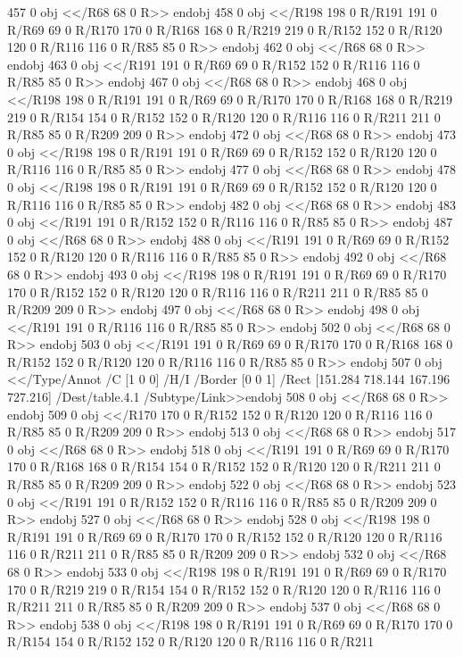 {{{{{{{{{{{{{{{{{{{{{{{{{{{{457 0 obj
<</R68
68 0 R>>
endobj
458 0 obj
<</R198
198 0 R/R191
191 0 R/R69
69 0 R/R170
170 0 R/R168
168 0 R/R219
219 0 R/R152
152 0 R/R120
120 0 R/R116
116 0 R/R85
85 0 R>>
endobj
462 0 obj
<</R68
68 0 R>>
endobj
463 0 obj
<</R191
191 0 R/R69
69 0 R/R152
152 0 R/R116
116 0 R/R85
85 0 R>>
endobj
467 0 obj
<</R68
68 0 R>>
endobj
468 0 obj
<</R198
198 0 R/R191
191 0 R/R69
69 0 R/R170
170 0 R/R168
168 0 R/R219
219 0 R/R154
154 0 R/R152
152 0 R/R120
120 0 R/R116
116 0 R/R211
211 0 R/R85
85 0 R/R209
209 0 R>>
endobj
472 0 obj
<</R68
68 0 R>>
endobj
473 0 obj
<</R198
198 0 R/R191
191 0 R/R69
69 0 R/R152
152 0 R/R120
120 0 R/R116
116 0 R/R85
85 0 R>>
endobj
477 0 obj
<</R68
68 0 R>>
endobj
478 0 obj
<</R198
198 0 R/R191
191 0 R/R69
69 0 R/R152
152 0 R/R120
120 0 R/R116
116 0 R/R85
85 0 R>>
endobj
482 0 obj
<</R68
68 0 R>>
endobj
483 0 obj
<</R191
191 0 R/R152
152 0 R/R116
116 0 R/R85
85 0 R>>
endobj
487 0 obj
<</R68
68 0 R>>
endobj
488 0 obj
<</R191
191 0 R/R69
69 0 R/R152
152 0 R/R120
120 0 R/R116
116 0 R/R85
85 0 R>>
endobj
492 0 obj
<</R68
68 0 R>>
endobj
493 0 obj
<</R198
198 0 R/R191
191 0 R/R69
69 0 R/R170
170 0 R/R152
152 0 R/R120
120 0 R/R116
116 0 R/R211
211 0 R/R85
85 0 R/R209
209 0 R>>
endobj
497 0 obj
<</R68
68 0 R>>
endobj
498 0 obj
<</R191
191 0 R/R116
116 0 R/R85
85 0 R>>
endobj
502 0 obj
<</R68
68 0 R>>
endobj
503 0 obj
<</R191
191 0 R/R69
69 0 R/R170
170 0 R/R168
168 0 R/R152
152 0 R/R120
120 0 R/R116
116 0 R/R85
85 0 R>>
endobj
507 0 obj
<</Type/Annot
/C [1 0 0]
/H/I
/Border [0 0 1]
/Rect [151.284 718.144 167.196 727.216]
/Dest/table.4.1
/Subtype/Link>>endobj
508 0 obj
<</R68
68 0 R>>
endobj
509 0 obj
<</R170
170 0 R/R152
152 0 R/R120
120 0 R/R116
116 0 R/R85
85 0 R/R209
209 0 R>>
endobj
513 0 obj
<</R68
68 0 R>>
endobj
517 0 obj
<</R68
68 0 R>>
endobj
518 0 obj
<</R191
191 0 R/R69
69 0 R/R170
170 0 R/R168
168 0 R/R154
154 0 R/R152
152 0 R/R120
120 0 R/R211
211 0 R/R85
85 0 R/R209
209 0 R>>
endobj
522 0 obj
<</R68
68 0 R>>
endobj
523 0 obj
<</R191
191 0 R/R152
152 0 R/R116
116 0 R/R85
85 0 R/R209
209 0 R>>
endobj
527 0 obj
<</R68
68 0 R>>
endobj
528 0 obj
<</R198
198 0 R/R191
191 0 R/R69
69 0 R/R170
170 0 R/R152
152 0 R/R120
120 0 R/R116
116 0 R/R211
211 0 R/R85
85 0 R/R209
209 0 R>>
endobj
532 0 obj
<</R68
68 0 R>>
endobj
533 0 obj
<</R198
198 0 R/R191
191 0 R/R69
69 0 R/R170
170 0 R/R219
219 0 R/R154
154 0 R/R152
152 0 R/R120
120 0 R/R116
116 0 R/R211
211 0 R/R85
85 0 R/R209
209 0 R>>
endobj
537 0 obj
<</R68
68 0 R>>
endobj
538 0 obj
<</R198
198 0 R/R191
191 0 R/R69
69 0 R/R170
170 0 R/R154
154 0 R/R152
152 0 R/R120
120 0 R/R116
116 0 R/R211
}}}}}}}}}}}}}}}}}}}}}}}}}}}}
